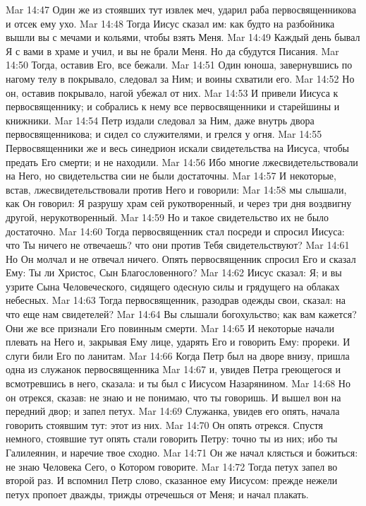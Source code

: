 Mar 14:47  Один же из стоявших тут извлек меч, ударил раба первосвященникова и отсек ему ухо.
Mar 14:48  Тогда Иисус сказал им: как будто на разбойника вышли вы с мечами и кольями, чтобы взять Меня.
Mar 14:49  Каждый день бывал Я с вами в храме и учил, и вы не брали Меня. Но да сбудутся Писания.
Mar 14:50  Тогда, оставив Его, все бежали.
Mar 14:51  Один юноша, завернувшись по нагому телу в покрывало, следовал за Ним; и воины схватили его.
Mar 14:52  Но он, оставив покрывало, нагой убежал от них.
Mar 14:53  И привели Иисуса к первосвященнику; и собрались к нему все первосвященники и старейшины и книжники.
Mar 14:54  Петр издали следовал за Ним, даже внутрь двора первосвященникова; и сидел со служителями, и грелся у огня.
Mar 14:55  Первосвященники же и весь синедрион искали свидетельства на Иисуса, чтобы предать Его смерти; и не находили.
Mar 14:56  Ибо многие лжесвидетельствовали на Него, но свидетельства сии не были достаточны.
Mar 14:57  И некоторые, встав, лжесвидетельствовали против Него и говорили:
Mar 14:58  мы слышали, как Он говорил: Я разрушу храм сей рукотворенный, и через три дня воздвигну другой, нерукотворенный.
Mar 14:59  Но и такое свидетельство их не было достаточно.
Mar 14:60  Тогда первосвященник стал посреди и спросил Иисуса: что Ты ничего не отвечаешь? что они против Тебя свидетельствуют?
Mar 14:61  Но Он молчал и не отвечал ничего. Опять первосвященник спросил Его и сказал Ему: Ты ли Христос, Сын Благословенного?
Mar 14:62  Иисус сказал: Я; и вы узрите Сына Человеческого, сидящего одесную силы и грядущего на облаках небесных.
Mar 14:63  Тогда первосвященник, разодрав одежды свои, сказал: на что еще нам свидетелей?
Mar 14:64  Вы слышали богохульство; как вам кажется? Они же все признали Его повинным смерти.
Mar 14:65  И некоторые начали плевать на Него и, закрывая Ему лице, ударять Его и говорить Ему: прореки. И слуги били Его по ланитам.
Mar 14:66  Когда Петр был на дворе внизу, пришла одна из служанок первосвященника
Mar 14:67  и, увидев Петра греющегося и всмотревшись в него, сказала: и ты был с Иисусом Назарянином.
Mar 14:68  Но он отрекся, сказав: не знаю и не понимаю, что ты говоришь. И вышел вон на передний двор; и запел петух.
Mar 14:69  Служанка, увидев его опять, начала говорить стоявшим тут: этот из них.
Mar 14:70  Он опять отрекся. Спустя немного, стоявшие тут опять стали говорить Петру: точно ты из них; ибо ты Галилеянин, и наречие твое сходно.
Mar 14:71  Он же начал клясться и божиться: не знаю Человека Сего, о Котором говорите.
Mar 14:72  Тогда петух запел во второй раз. И вспомнил Петр слово, сказанное ему Иисусом: прежде нежели петух пропоет дважды, трижды отречешься от Меня; и начал плакать.
